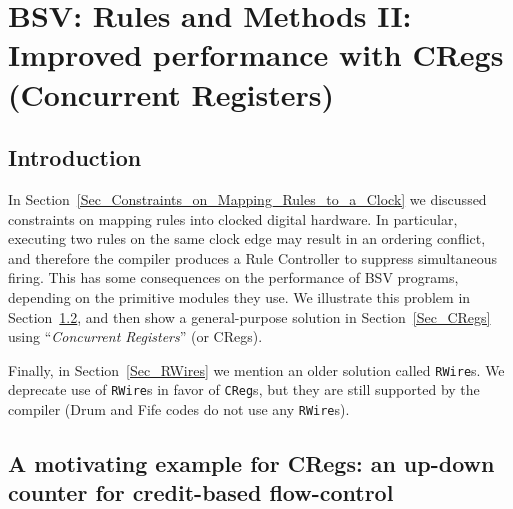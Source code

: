 

\chapter{BSV: Rules and Methods II: Improved performance with CRegs (Concurrent Registers)}


\setcounter{page}{1}
\renewcommand{\thepage}{\arabic{chapter}-\arabic{page}}

\label{ch_Rules_II}


\section{Introduction}

In Section~\ref{Sec_Constraints_on_Mapping_Rules_to_a_Clock} we
discussed constraints on mapping rules into clocked digital hardware.
In particular, executing two rules on the same clock edge may result
in an ordering conflict, and therefore the compiler produces a Rule
Controller to suppress simultaneous firing.  This has some
consequences on the performance of BSV programs, depending on the
primitive modules they use.  We illustrate this problem in
Section~\ref{Sec_Up_Down_Counter}, and then show a general-purpose
solution in Section~\ref{Sec_CRegs} using ``\emph{Concurrent
Registers}'' (or CRegs).

Finally, in Section~\ref{Sec_RWires} we mention an older solution
called \verb|RWire|s.  We deprecate use of \verb|RWire|s in favor of
\verb|CReg|s, but they are still supported by the compiler (Drum and
Fife codes do not use any \verb|RWire|s).


\section{A motivating example for CRegs: an up-down counter for credit-based flow-control}

\label{Sec_Up_Down_Counter}

